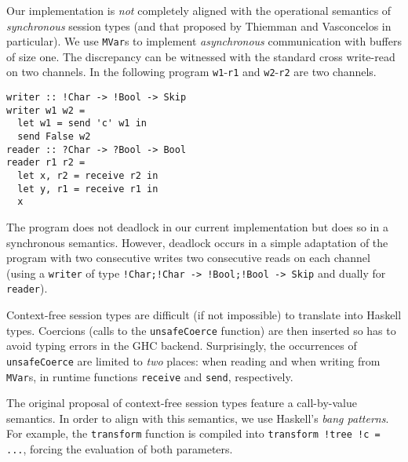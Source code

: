 Our implementation is \emph{not} completely aligned with the
operational semantics of \emph{synchronous} session types (and that
proposed by Thiemman and Vasconcelos in particular). We use
\lstinline|MVar|s to implement \emph{asynchronous} communication with
buffers of size one. The discrepancy can be witnessed with the standard
cross write-read on two channels. In the following program
\lstinline|w1|-\lstinline|r1| and \lstinline|w2|-\lstinline|r2| are
two channels.
%
\begin{lstlisting}
writer :: !Char -> !Bool -> Skip
writer w1 w2 =
  let w1 = send 'c' w1 in
  send False w2
reader :: ?Char -> ?Bool -> Bool
reader r1 r2 =
  let x, r2 = receive r2 in
  let y, r1 = receive r1 in
  x
\end{lstlisting}
%
The program does not deadlock in our current implementation but does
so in a synchronous semantics. However, deadlock occurs in a simple
adaptation of the program with two consecutive writes two consecutive
reads on each channel (using a \lstinline|writer| of type
\lstinline|!Char;!Char -> !Bool;!Bool -> Skip| and dually for
\lstinline|reader|).


Context-free session types are difficult (if not impossible) to
translate into Haskell types. Coercions (calls to the
\lstinline|unsafeCoerce| function) are then inserted so has to avoid
typing errors in the GHC backend. Surprisingly, the occurrences of
\lstinline|unsafeCoerce| are limited to \emph{two} places: when reading
and when writing from \lstinline|MVar|s, in runtime functions
\lstinline|receive| and \lstinline|send|, respectively.

The original proposal of context-free session types feature a
call-by-value semantics. In order to align \freest{} with this
semantics, we use Haskell's \emph{bang patterns}. For example, the
\lstinline|transform| function is compiled into
\lstinline|transform !tree !c = ...|, forcing the evaluation of both
parameters.

